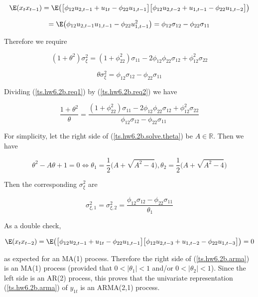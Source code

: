 \begin{enumerate}[(a)]

\[
\E(x_t x_{t-1})= \E\big( \big[\phi_{12} u_{2,t-1} +u_{1t}   - \phi_{22}u_{1,t-1} \big]\big[\phi_{12} u_{2,t-2} +u_{1,t-1}   - \phi_{22}u_{1,t-2} \big]  \big) 
\]

\[
= \E\big( \phi_{12} u_{2,t-1}u_{1,t-1}  - \phi_{22}u_{1,t-1} ^2 \big) = \phi_{12}\sigma_{12} - \phi_{22} \sigma_{11}
\]

Therefore we require

\begin{equation}\label{ts.hw6.2b.req1}
 (1 + \theta^2)\sigma_{\xi}^2 = ( 1 + \phi_{22}^2 )\sigma_{11}  - 2 \phi_{12} \phi_{22} \sigma_{12} +  \phi_{12}^2 \sigma_{22}
\end{equation}

\begin{equation}\label{ts.hw6.2b.req2}
\theta \sigma_{\xi}^2  =  \phi_{12}\sigma_{12} - \phi_{22} \sigma_{11}
\end{equation}

Dividing (\ref{ts.hw6.2b.req1}) by (\ref{ts.hw6.2b.req2}) we have

\begin{equation}\label{ts.hw6.2b.solve.theta}
\frac{ 1 + \theta^2}{\theta} = \frac{( 1 + \phi_{22}^2 )\sigma_{11}  - 2 \phi_{12} \phi_{22} \sigma_{12} +  \phi_{12}^2 \sigma_{22}}{ \phi_{12}\sigma_{12} - \phi_{22} \sigma_{11}}
\end{equation}

For simplicity, let the right side of (\ref{ts.hw6.2b.solve.theta}) be \(A \in \mathbb{R}\). Then we have

\[
\theta^2 - A \theta + 1 = 0 \iff \boxed{\theta_1 = \frac{1}{2} \big( A + \sqrt{A^2 - 4} \big), \theta_2 = \frac{1}{2} \big( A + \sqrt{A^2 - 4} \big)}
\]

Then the corresponding \(\sigma_{\xi}^2\) are

\[
\boxed{\sigma_{\xi, 1}^2  = \sigma_{\xi, 2}^2  =   \frac{\phi_{12}\sigma_{12} - \phi_{22} \sigma_{11}}{\theta_1}}
\]


As a double check,

\[
\E(x_t x_{t-2}) = \E\big( \big[\phi_{12} u_{2,t-1} +u_{1t}   - \phi_{22}u_{1,t-1} \big]\big[\phi_{12} u_{2,t-3} +u_{1,t-2}   - \phi_{22}u_{1,t-3} \big]  \big) = 0
\]

as expected for an MA(1) process. Therefore the right side of (\ref{ts.hw6.2b.arma}) is an MA(1) process (provided that \(0 < |\theta_1| < 1\) and/or \(0 < |\theta_2| < 1\)). Since the left side is an AR(2) process, this proves that the univariate representation (\ref{ts.hw6.2b.arma}) of \(y_{1t}\) is an ARMA(2,1) process.

\end{enumerate}



